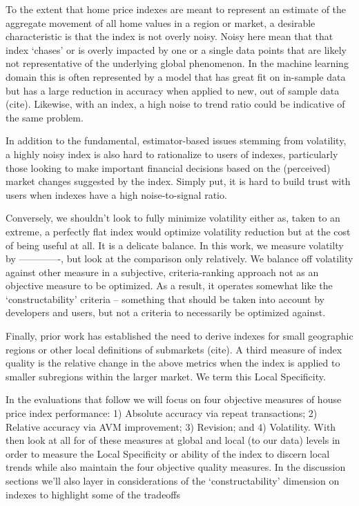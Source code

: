 \documentclass[
]{article}
\begin{document}
To the extent that home price indexes are meant to represent an estimate
of the aggregate movement of all home values in a region or market, a
desirable characteristic is that the index is not overly noisy. Noisy
here mean that that index `chases' or is overly impacted by one or a
single data points that are likely not representative of the underlying
global phenomenon. In the machine learning domain this is often
represented by a model that has great fit on in-sample data but has a
large reduction in accuracy when applied to new, out of sample data
(cite). Likewise, with an index, a high noise to trend ratio could be
indicative of the same problem.

In addition to the fundamental, estimator-based issues stemming from
volatility, a highly noisy index is also hard to rationalize to users of
indexes, particularly those looking to make important financial
decisions based on the (perceived) market changes suggested by the
index. Simply put, it is hard to build trust with users when indexes
have a high noise-to-signal ratio.

Conversely, we shouldn't look to fully minimize volatility either as,
taken to an extreme, a perfectly flat index would optimize volatility
reduction but at the cost of being useful at all. It is a delicate
balance. In this work, we measure volatilty by -------------, but look
at the comparison only relatively. We balance off volatility against
other measure in a subjective, criteria-ranking approach not as an
objective measure to be optimized. As a result, it operates somewhat
like the `constructability' criteria -- something that should be taken
into account by developers and users, but not a criteria to necessarily
be optimized against.

Finally, prior work has established the need to derive indexes for small
geographic regions or other local definitions of submarkets (cite). A
third measure of index quality is the relative change in the above
metrics when the index is applied to smaller subregions within the
larger market. We term this Local Specificity.

In the evaluations that follow we will focus on four objective measures
of house price index performance: 1) Absolute accuracy via repeat
transactions; 2) Relative accuracy via AVM improvement; 3) Revision; and
4) Volatility. With then look at all for of these measures at global and
local (to our data) levels in order to measure the Local Specificity or
ability of the index to discern local trends while also maintain the
four objective quality measures. In the discussion sections we'll also
layer in considerations of the `constructability' dimension on indexes
to highlight some of the tradeoffs
\end{document}
